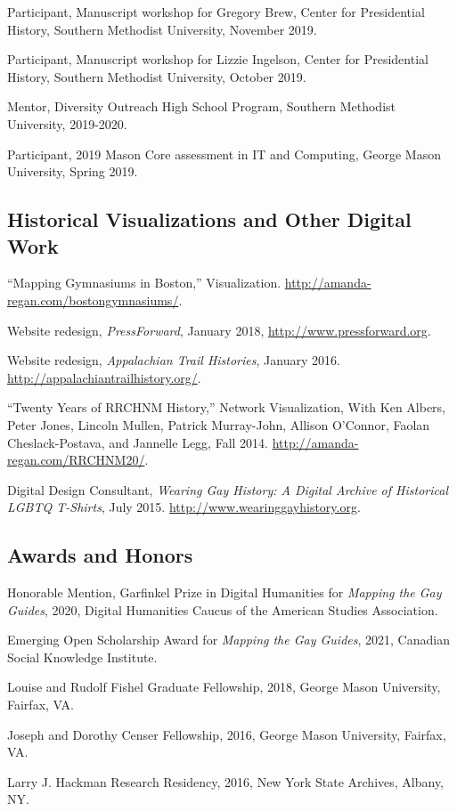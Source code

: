 \documentclass[11pt]{article}
\begin{document}
Participant, Manuscript workshop for Gregory Brew, Center for Presidential History, Southern Methodist University, November 2019.

Participant, Manuscript workshop for Lizzie Ingelson, Center for Presidential History, Southern Methodist University, October 2019.

Mentor, Diversity Outreach High School Program, Southern Methodist University, 2019-2020.

Participant, 2019 Mason Core assessment in IT and Computing, George Mason University, Spring 2019.

\subsection{Historical Visualizations and Other Digital Work}\label{other-digital-work}
``Mapping Gymnasiums in Boston,'' Visualization. \url{http://amanda-regan.com/bostongymnasiums/}.

Website redesign, \emph{PressForward}, January 2018, \url{http://www.pressforward.org}.

Website redesign, \emph{Appalachian Trail Histories}, January 2016. \url{http://appalachiantrailhistory.org/}.

``Twenty Years of RRCHNM History,'' Network Visualization, With Ken Albers, Peter Jones, Lincoln Mullen, Patrick Murray-John, Allison O’Connor, Faolan Cheslack-Postava, and Jannelle Legg, Fall 2014. \url{http://amanda-regan.com/RRCHNM20/}.

Digital Design Consultant, \emph{Wearing Gay History: A Digital Archive of Historical LGBTQ T-Shirts}, July 2015. \url{http://www.wearinggayhistory.org}.

\subsection{Awards and Honors}
Honorable Mention, Garfinkel Prize in Digital Humanities for \emph{Mapping the Gay Guides}, 2020, Digital Humanities Caucus of the American Studies Association.

Emerging Open Scholarship Award for \emph{Mapping the Gay Guides}, 2021, Canadian Social Knowledge Institute.

Louise and Rudolf Fishel Graduate Fellowship, 2018, George Mason University, Fairfax, VA.

Joseph and Dorothy Censer Fellowship, 2016, George Mason University, Fairfax, VA.

Larry J. Hackman Research Residency, 2016, New York State Archives, Albany, NY.
\end{document}
